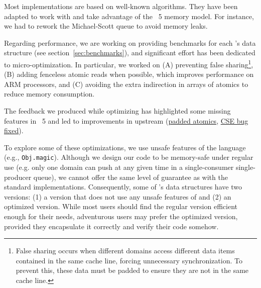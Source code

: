 \documentclass[a4paper, 11pt]{article}
\begin{document}
Most implementations are based on well-known algorithms.
They have been adapted to work with and take advantage of the \OCaml~5 memory model.
For instance, we had to rework the Michael-Scott queue to avoid memory leaks.

Regarding performance, we are working on providing benchmarks for each \Saturn's data structure (see section~\ref{sec:benchmarks}), and significant effort has been dedicated to micro-optimization. In particular, we worked on
(A) preventing false sharing\footnote[1]{False sharing occurs when different domains access different data items contained in the same cache line, forcing unnecessary synchronization. To prevent this, these data must be padded to ensure they are not in the same cache line.},
(B) adding fenceless atomic reads when possible, which improves performance on ARM processors, and
(C) avoiding the extra indirection in arrays of atomics to reduce memory consumption.

The feedback we produced while optimizing \Saturn has highlighted some missing features in \OCaml~5 and led to improvements in upstream \OCaml (\href{https://github.com/ocaml/ocaml/pull/12212}{padded atomics}, \href{https://github.com/ocaml/ocaml/pull/12715}{CSE bug fixed}).

To explore some of these optimizations, we use unsafe features of the language (e.g., \texttt{Obj.magic}). Although we design our code to be memory-safe under regular use (e.g. only one domain can push at any given time in a single-consumer single-producer queue), we cannot offer the same level of guarantee as with the standard implementations. Consequently, some of \Saturn's data structures have two versions: (1) a version that does not use any unsafe features of \OCaml and (2) an optimized version. While most users should find the regular version efficient enough for their needs, adventurous users may prefer the optimized version, provided they encapsulate it correctly and verify their code somehow.


\end{document}
